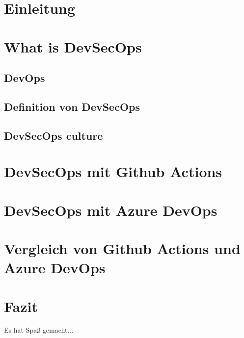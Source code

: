 \chapter{Einleitung}



\chapter{What is DevSecOps}
\section{DevOps}
\section{Definition von DevSecOps}
\section{DevSecOps culture}
\chapter{DevSecOps mit Github Actions}

\chapter{DevSecOps mit Azure DevOps}

\chapter{Vergleich von Github Actions und Azure DevOps}

\chapter{Fazit}
Es hat Spaß gemacht...
